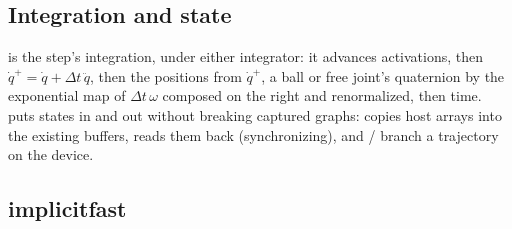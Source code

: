 \subsection{Integration and state}\label{sec:integrate}

 is the step's integration,  under either integrator: it advances activations, then $\dot q^+ = \dot q + \Delta t\,\ddot q$, then the positions from $\dot q^+$, a ball or free joint's quaternion by the exponential map of $\Delta t\,\omega$ composed on the right and renormalized, then time.  puts states in and out without breaking captured graphs:  copies  host arrays into the existing buffers,  reads them back (synchronizing), and / branch a trajectory on the device.

\subsection{implicitfast}\label{sec:implicit}

